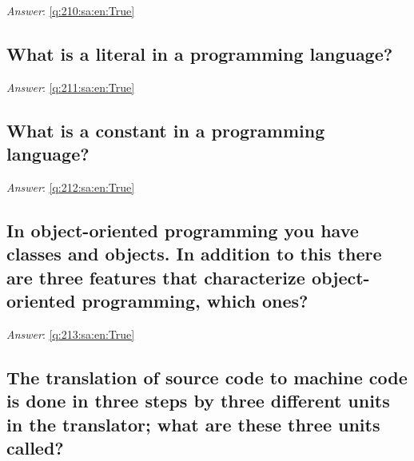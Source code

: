 \documentclass[a4paper,11pt,oneside]{article}
\begin{document}
\begin{sloppypar}
\noindent\makebox[\textwidth]{\hrulefill}

\vspace{1cm}

\textit{Answer}: \autoref{q:210:sa:en:True}



\subsection{What is a literal in a programming language?}

\label{q:211:sa:en:False}

\vspace{2cm}

\noindent\makebox[\textwidth]{\hrulefill}

\vspace{1cm}

\textit{Answer}: \autoref{q:211:sa:en:True}



\subsection{What is a constant in a programming language?}

\label{q:212:sa:en:False}

\vspace{2cm}

\noindent\makebox[\textwidth]{\hrulefill}

\vspace{1cm}

\textit{Answer}: \autoref{q:212:sa:en:True}



\subsection{In object-oriented programming you have classes and objects. In addition to this there are three features that characterize object-oriented programming, which ones?}

\label{q:213:sa:en:False}

\vspace{2cm}

\noindent\makebox[\textwidth]{\hrulefill}

\vspace{1cm}

\textit{Answer}: \autoref{q:213:sa:en:True}



\subsection{The translation of source code to machine code is done in three steps by three different units in the translator; what are these three units called?}


\end{sloppypar}
\end{document}

